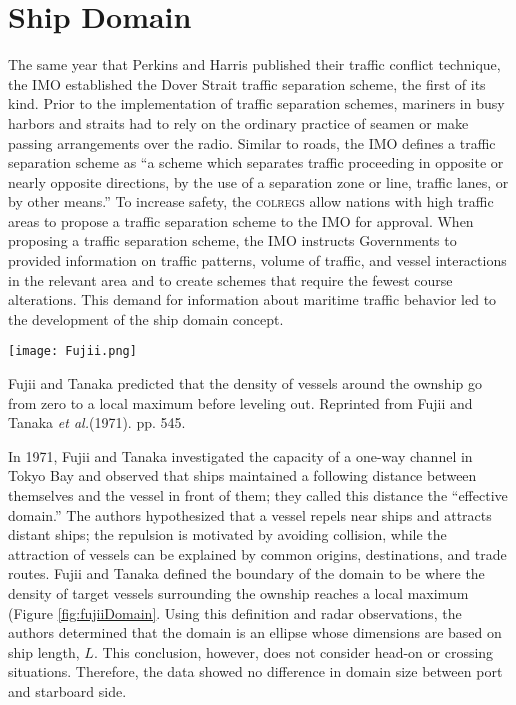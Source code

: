 \documentclass[twoside,symmetric,notoc]{tufte-book}
\newcommand{\etal}{\textit{et al.}\xspace}
\begin{document}
\section{Ship Domain}
\label{sec:shipdomain}
\par{%
The same year that Perkins and Harris published their traffic conflict technique, the IMO established the Dover Strait traffic separation scheme, the first of its kind. Prior to the implementation of traffic separation schemes, mariners in busy harbors and straits had to rely on the ordinary practice of seamen or make passing arrangements over the radio.\cite{Beattie} Similar to roads, the IMO defines a traffic separation scheme as ``a scheme which separates traffic proceeding in opposite or nearly opposite directions, by the use of a separation zone or line, traffic lanes, or by other means.''\cite[-0.2in]{Llana} To increase safety, the \textsc{colregs} allow nations with high traffic areas to propose a traffic separation scheme to the IMO for approval.\cite{Caminos} When proposing a traffic separation scheme, the IMO instructs Governments to provided information on traffic patterns, volume of traffic, and vessel interactions in the relevant area and to create schemes that require the fewest course alterations.\cite{IMO_guidance} This demand for information about maritime traffic behavior led to the development of the ship domain concept.
}
\begin{marginfigure}
\centering
	\texttt{[image: Fujii.png]}
	\caption[Fujii and Tanaka predicted that the density of vessels around the ownship go from zero to a local maximum before leveling out.]{Fujii and Tanaka predicted that the density of vessels around the ownship go from zero to a local maximum before leveling out. Reprinted from Fujii and Tanaka \etal (1971). pp. 545.}
	\label{fig:fujiiDomain}
\end{marginfigure}
\par{%
In 1971, Fujii and Tanaka\cite{Fujii} investigated the capacity of a one-way channel in Tokyo Bay and observed that ships maintained a following distance between themselves and the vessel in front of them; they called this distance the ``effective domain.'' The authors hypothesized that a vessel repels near ships and attracts distant ships; the repulsion is motivated by avoiding collision, while the attraction of vessels can be explained by common origins, destinations, and trade routes. Fujii and Tanaka defined the boundary of the domain to be where the density of target vessels surrounding the ownship reaches a local maximum (Figure \ref{fig:fujiiDomain}. Using this definition and radar observations, the authors determined that the domain is an ellipse whose dimensions are based on ship length, $L$. This conclusion, however, does not consider head-on or crossing situations. Therefore, the data showed no difference in domain size between port and starboard side.
}
\end{document}
